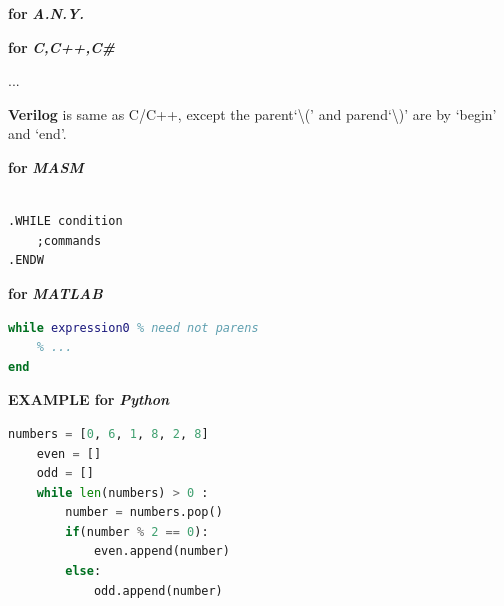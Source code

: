 \textbf{for }\textbf{\textit{A.N.Y.}}





\textbf{for }\textbf{\textit{C,C++,C\#}}



...



\textbf{Verilog} is same as C/C++, except the parent`\textbackslash{}(' and parend`\textbackslash{})' are by `begin' and `end'.



\textbf{for }\textbf{\textit{MASM}}

\lstset{style=GlobalASMx86}

\begin{lstlisting}[language={[x86masm]Assembler}]

.WHILE condition
	;commands
.ENDW
\end{lstlisting}



\textbf{for }\textbf{\textit{MATLAB}}

\begin{lstlisting}[language=MATLAB]
while expression0 % need not parens
	% ...
end
\end{lstlisting}



\textbf{EXAMPLE for }\textbf{\textit{Python}}

\begin{lstlisting}[language=Python]
	numbers = [0, 6, 1, 8, 2, 8]
	even = []
	odd = []
	while len(numbers) > 0 :
		number = numbers.pop()
		if(number % 2 == 0):
			even.append(number)
		else:
			odd.append(number)
\end{lstlisting}

